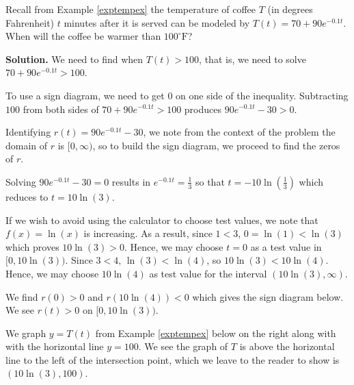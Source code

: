 \documentclass{ximera}
\begin{document}
\begin{example}  \label{coffeewarmerex} Recall from Example \ref{exptempex}  the temperature of coffee $T$ (in degrees Fahrenheit) $t$ minutes after it is served can be modeled by $T(t) = 70 + 90 e^{-0.1 t}$.  When will the coffee be warmer than $100^{\circ}\mbox{F}$?

\smallskip

{\bf Solution.}  We need to find when $T(t) > 100$, that is, we need to solve  $70 + 90 e^{-0.1 t} > 100$.  

\smallskip

To use a sign diagram, we need to get $0$ on one side of the inequality.  Subtracting $100$ from both sides of $70 + 90 e^{-0.1 t} > 100$ produces   $90 e^{-0.1 t} - 30 > 0$. 

\smallskip

Identifying  $r(t) = 90 e^{-0.1 t} - 30$, we note from the context of the problem the domain of $r$ is $[0, \infty)$, so to build the sign diagram, we proceed to find the zeros of $r$.  

\smallskip

Solving $90 e^{-0.1 t} - 30=0$ results in $e^{-0.1t} = \frac{1}{3}$ so that $t = -10\ln\left(\frac{1}{3}\right)$  which reduces to $t = 10 \ln(3)$.

\smallskip

If we wish to avoid using the calculator to choose test values, we note that $f(x)  = \ln(x)$ is increasing.  As a result,  since $1 < 3$, $0 = \ln(1) < \ln(3)$ which proves $10\ln(3) > 0$. Hence, we may choose $t = 0$ as a test value in $[0, 10 \ln(3))$.  Since $3 < 4$, $\ln(3) < \ln(4)$, so $10 \ln(3) < 10 \ln(4)$. Hence,  we may choose $10 \ln(4)$   as test value for the interval $(10 \ln(3), \infty)$. 

\smallskip

We find $r(0)>0$ and $r(10\ln(4))<0$  which gives  the sign diagram below. We see $r(t)>0$ on $[0, 10\ln(3))$.

\smallskip

We graph $y=T(t)$ from Example  \ref{exptempex} below on the right along with with the horizontal line $y = 100$.   We see the graph of $T$ is above the horizontal line to the left of the intersection point, which we leave to the reader to show is $(10 \ln(3), 100)$.

\begin{center}

\begin{tabular}{m{0.5in}m{2.5in}m{2.5in}}


\end{tabular}
\end{center}
\end{example}
\end{document}
